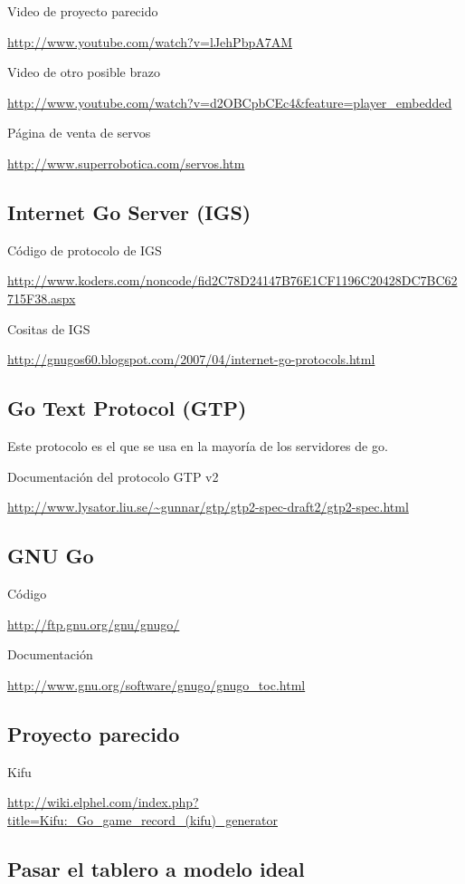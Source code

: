 \documentclass[12pt,a4paper]{report}
\begin{document}
Video de proyecto parecido

\url{http://www.youtube.com/watch?v=lJehPbpA7AM}

Video de otro posible brazo

\url{http://www.youtube.com/watch?v=d2OBCpbCEc4&feature=player_embedded}

Página de venta de servos

\url{http://www.superrobotica.com/servos.htm}


\subsection{Internet Go Server (IGS)}

Código de protocolo de IGS

\url{http://www.koders.com/noncode/fid2C78D24147B76E1CF1196C20428DC7BC62715F38.aspx}

Cositas de IGS

\url{http://gnugos60.blogspot.com/2007/04/internet-go-protocols.html}

\subsection{Go Text Protocol (GTP)}

Este protocolo es el que se usa en la mayoría de los servidores de go. 

Documentación del protocolo GTP v2

\url{http://www.lysator.liu.se/~gunnar/gtp/gtp2-spec-draft2/gtp2-spec.html }

\subsection{GNU Go}

Código

\url{http://ftp.gnu.org/gnu/gnugo/}

Documentación

\url{http://www.gnu.org/software/gnugo/gnugo_toc.html}

\subsection{Proyecto parecido}

Kifu

\url{http://wiki.elphel.com/index.php?title=Kifu:_Go_game_record_(kifu)_generator}

\subsection{ Pasar el tablero a modelo ideal}
\end{document}
